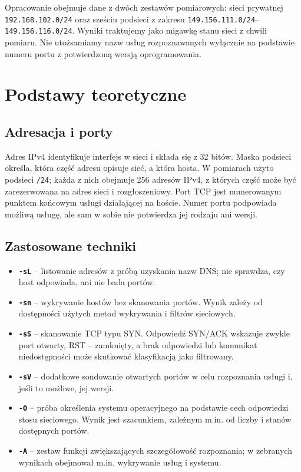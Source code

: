 \documentclass[11pt,a4paper]{article}
\begin{document}
Opracowanie obejmuje dane z dwóch zestawów pomiarowych: sieci prywatnej
\texttt{192.168.102.0/24} oraz sześciu podsieci z zakresu \texttt{149.156.111.0/24}--
\texttt{149.156.116.0/24}. Wyniki traktujemy jako migawkę stanu sieci z chwili pomiaru.
Nie utożsamiamy nazw usług rozpoznawanych wyłącznie na podstawie numeru portu
z potwierdzoną wersją oprogramowania.

\section{Podstawy teoretyczne}
\subsection{Adresacja i porty}
Adres IPv4 identyfikuje interfejs w sieci i składa się z 32 bitów. Maska podsieci
określa, która część adresu opisuje sieć, a która hosta. W pomiarach użyto podsieci
\texttt{/24}; każda z nich obejmuje 256 adresów IPv4, z których część może być
zarezerwowana na adres sieci i rozgłoszeniowy. Port TCP jest numerowanym punktem
końcowym usługi działającej na hoście. Numer portu podpowiada możliwą usługę, ale sam
w sobie nie potwierdza jej rodzaju ani wersji.

\subsection{Zastosowane techniki}
\begin{itemize}
  \item \textbf{\texttt{-sL}} -- listowanie adresów z próbą uzyskania nazw DNS; nie
        sprawdza, czy host odpowiada, ani nie bada portów.
  \item \textbf{\texttt{-sn}} -- wykrywanie hostów bez skanowania portów. Wynik zależy
        od dostępności użytych metod wykrywania i filtrów sieciowych.
  \item \textbf{\texttt{-sS}} -- skanowanie TCP typu SYN. Odpowiedź SYN/ACK wskazuje
        zwykle port otwarty, RST -- zamknięty, a brak odpowiedzi lub komunikat
        niedostępności może skutkować klasyfikacją jako filtrowany.
  \item \textbf{\texttt{-sV}} -- dodatkowe sondowanie otwartych portów w celu
        rozpoznania usługi i, jeśli to możliwe, jej wersji.
  \item \textbf{\texttt{-O}} -- próba określenia systemu operacyjnego na podstawie
        cech odpowiedzi stosu sieciowego. Wynik jest szacunkiem, zależnym m.in. od
        liczby i stanów dostępnych portów.
  \item \textbf{\texttt{-A}} -- zestaw funkcji zwiększających szczegółowość
        rozpoznania; w zebranych wynikach obejmował m.in. wykrywanie usług i systemu.
\end{itemize}
\end{document}
